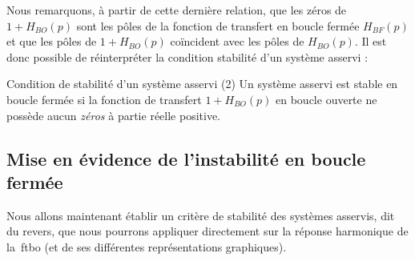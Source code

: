 Nous remarquons, à partir de cette dernière relation,
que les zéros de $1+H_{BO}(p)$ sont les pôles de la fonction de 
transfert en boucle fermée $H_{BF}(p)$ et que les pôles 
de $1+H_{BO}(p)$ co\"incident avec 
les pôles de $H_{BO}(p)$. Il est donc possible de 
réinterpréter la condition stabilité d'un système asservi :
\begin{criteria}{Condition de stabilité d'un système asservi (2)}
    Un système asservi est stable en boucle fermée si la fonction 
    de transfert $1+H_{BO}(p)$ en boucle ouverte ne possède aucun 
    \emph{zéros} à partie réelle positive.
\end{criteria}
\subsection{Mise en évidence de l'instabilité en boucle fermée}
Nous allons maintenant établir un critère de stabilité des 
systèmes asservis, dit du revers, que nous pourrons appliquer directement 
sur la réponse harmonique de la~\gls{ftbo} (et de ses différentes 
représentations graphiques).

